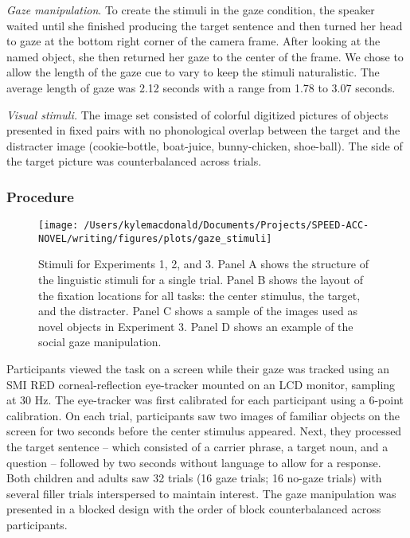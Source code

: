 \documentclass[man,floatsintext]{apa6}
\begin{document}
\emph{Gaze manipulation}. To create the stimuli in the gaze condition,
the speaker waited until she finished producing the target sentence and
then turned her head to gaze at the bottom right corner of the camera
frame. After looking at the named object, she then returned her gaze to
the center of the frame. We chose to allow the length of the gaze cue to
vary to keep the stimuli naturalistic. The average length of gaze was
2.12 seconds with a range from 1.78 to 3.07 seconds.

\emph{Visual stimuli.} The image set consisted of colorful digitized
pictures of objects presented in fixed pairs with no phonological
overlap between the target and the distracter image (cookie-bottle,
boat-juice, bunny-chicken, shoe-ball). The side of the target picture
was counterbalanced across trials.

\subsubsection{Procedure}\label{procedure}

\begin{figure}[!t]

{\centering \texttt{[image: /Users/kylemacdonald/Documents/Projects/SPEED-ACC-NOVEL/writing/figures/plots/gaze\_stimuli]} 

}

\caption{Stimuli for Experiments 1, 2, and 3. Panel A shows the structure of the linguistic stimuli for a single trial. Panel B shows the layout of the fixation locations for all tasks: the center stimulus, the target, and the distracter. Panel C shows a sample of the images used as novel objects in Experiment 3. Panel D shows an example of the social gaze manipulation.}\label{fig:gaze-stimuli}
\end{figure}

Participants viewed the task on a screen while their gaze was tracked
using an SMI RED corneal-reflection eye-tracker mounted on an LCD
monitor, sampling at 30 Hz. The eye-tracker was first calibrated for
each participant using a 6-point calibration. On each trial,
participants saw two images of familiar objects on the screen for two
seconds before the center stimulus appeared. Next, they processed the
target sentence -- which consisted of a carrier phrase, a target noun,
and a question -- followed by two seconds without language to allow for
a response. Both children and adults saw 32 trials (16 gaze trials; 16
no-gaze trials) with several filler trials interspersed to maintain
interest. The gaze manipulation was presented in a blocked design with
the order of block counterbalanced across participants.
\end{document}
